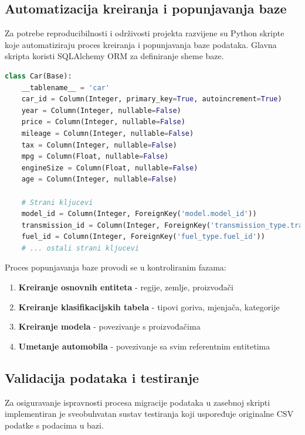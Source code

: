 \subsection{Automatizacija kreiranja i popunjavanja baze}

Za potrebe reproducibilnosti i održivosti projekta razvijene su Python skripte koje automatiziraju proces kreiranja i popunjavanja baze podataka. Glavna skripta koristi SQLAlchemy ORM za definiranje sheme baze.

\begin{lstlisting}[language=Python, caption={Definiranje ORM modela za glavni entitet automobila}]
class Car(Base):
    __tablename__ = 'car'
    car_id = Column(Integer, primary_key=True, autoincrement=True)
    year = Column(Integer, nullable=False)
    price = Column(Integer, nullable=False)
    mileage = Column(Integer, nullable=False)
    tax = Column(Integer, nullable=False)
    mpg = Column(Float, nullable=False)
    engineSize = Column(Float, nullable=False)
    age = Column(Integer, nullable=False)
    
    # Strani kljucevi
    model_id = Column(Integer, ForeignKey('model.model_id'))
    transmission_id = Column(Integer, ForeignKey('transmission_type.transmission_id'))
    fuel_id = Column(Integer, ForeignKey('fuel_type.fuel_id'))
    # ... ostali strani kljucevi
\end{lstlisting}

Proces popunjavanja baze provodi se u kontroliranim fazama:
\begin{enumerate}
    \item \textbf{Kreiranje osnovnih entiteta} - regije, zemlje, proizvođači
    \item \textbf{Kreiranje klasifikacijskih tabela} - tipovi goriva, mjenjača, kategorije
    \item \textbf{Kreiranje modela} - povezivanje s proizvođačima
    \item \textbf{Umetanje automobila} - povezivanje sa svim referentnim entitetima
\end{enumerate}

\subsection{Validacija podataka i testiranje}

Za osiguravanje ispravnosti procesa migracije podataka u zasebnoj skripti implementiran je sveobuhvatan sustav testiranja koji uspoređuje originalne CSV podatke s podacima u bazi.

